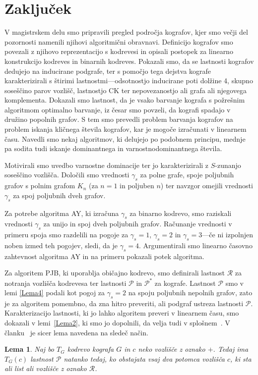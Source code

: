 \documentclass[12pt,a4paper,twoside]{article}
\theoremstyle{definition} %
\theoremstyle{plain} %
\newtheorem{lema}[definicija]{Lema}
\numberwithin{equation}{section}  %
\begin{document}
\section{Zaključek}
V magistrskem delu smo pripravili pregled področja kografov, kjer smo večji del pozornosti namenili njihovi algoritmični obravnavi. Definicijo kografov smo povezali z njihovo reprezentacijo s kodrevesi in opisali postopek za linearno konstrukcijo kodreves in binarnih kodreves. Pokazali smo, da se lastnosti kografov dedujejo na inducirane podgrafe, ter s pomočjo tega dejstva kografe karakterizirali s štirimi lastnostmi---odsotnostjo inducirane poti dolžine 4, skupno soseščino parov vozlišč, lastnostjo CK ter nepovezanostjo ali grafa ali njegovega komplementa. Dokazali smo lastnost, da je vsako barvanje kografa s požrešnim algoritmom optimalno barvanje, iz česar smo povzeli, da kografi spadajo v družino popolnih grafov. S tem smo prevedli problem barvanja kografov na problem iskanja kličnega števila kografov, kar je mogoče izračunati v linearnem času. Navedli smo nekaj algoritmov, ki delujejo po podobnem principu, mednje pa sodita tudi iskanje dominantnega in varnostnodominantnega števila.

Motivirali smo uvedbo varnostne dominacije ter jo karakterizirali z $S$-zunanjo soseščino vozlišča. Določili smo vrednosti $\gamma_s$ za polne grafe, spoje poljubnih grafov s polnim grafom $K_n$ (za $n=1$ in poljuben $n$) ter navzgor omejili vrednosti $\gamma_s$ za spoj poljubnih dveh grafov.

Za potrebe algoritma AY, ki izračuna $\gamma_s$ za binarno kodrevo, smo raziskali vrednosti $\gamma_s$ za unijo in spoj dveh poljubnih grafov. Računanje vrednosti v primeru spoja smo razdelili na pogoje za $\gamma_s=1$, $\gamma_s=2$ in $\gamma_s=3$---če ni izpolnjen noben izmed teh pogojev, sledi, da je $\gamma_s = 4$. Argumentirali smo linearno časovno zahtevnost algoritma AY in na primeru pokazali potek algoritma. 

Za algoritem PJB, ki uporablja običajno kodrevo, smo definirali lastnost $\mathcal{R}$ za notranja vozlišča kodrevesa ter lastnosti $\mathcal{P}$ in $\mathcal{P^*}$ za kografe. Lastnost $\mathcal{P}$ smo v lemi \ref{Lema4} podali kot pogoj za $\gamma_s = 2$ na spoju poljubnih nepolnih grafov, zato je za algoritem pomembno, da zna hitro preveriti, ali podgraf ustreza lastnosti $\mathcal{P}$. Karakterizacijo lastnosti, ki jo lahko algoritem preveri v linearnem času, smo dokazali v lemi~\ref{Lema2}, ki smo jo dopolnili, da velja tudi v splošnem~\cite{kisek2020onJha}. V članku~\cite{jha2019secure} je sicer lema navedena na sledeč način.
\begin{lema}{\rm{\cite[Lemma 2]{jha2019secure}}}\label{OriginalLemma2} Naj bo $T_G$ kodrevo kografa $G$ in $c$ neko vozlišče z oznako $+$. Tedaj ima $T_G(c)$ lastnost $\mathcal{P}$ natanko tedaj, ko obstajata vsaj dva potomca vozlišča $c$, ki sta ali list ali vozlišče z oznako $\mathcal{R}$.
\end{lema}
\end{document}
